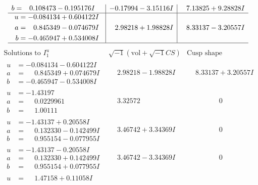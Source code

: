 \documentclass[1p]{elsarticle_modified}
\theoremstyle{definition}
\newcommand{\I}{\sqrt{-1}}
\begin{document}
$$\begin{array}{c|c|c}
\begin{aligned}
b &= \phantom{-}0.108473 - 0.195176 I\end{aligned}
 & -0.17994 - 3.15116 I & \phantom{-}7.13825 + 9.28828 I \\ \hline\begin{aligned}
u &= -0.084134 + 0.604122 I \\
a &= \phantom{-}0.845349 - 0.074679 I \\
b &= -0.465947 + 0.534008 I\end{aligned}
 & \phantom{-}2.98218 + 1.98828 I & \phantom{-}8.33137 - 3.20557 I\\
 \hline 
 \end{array}$$\newpage$$\begin{array}{c|c|c}  
\text{Solutions to }I^u_{1}& \I (\text{vol} + \sqrt{-1}CS) & \text{Cusp shape}\\
 \hline 
\begin{aligned}
u &= -0.084134 - 0.604122 I \\
a &= \phantom{-}0.845349 + 0.074679 I \\
b &= -0.465947 - 0.534008 I\end{aligned}
 & \phantom{-}2.98218 - 1.98828 I & \phantom{-}8.33137 + 3.20557 I \\ \hline\begin{aligned}
u &= -1.43197\phantom{ +0.000000I} \\
a &= \phantom{-}0.0229961\phantom{ +0.000000I} \\
b &= \phantom{-}1.00111\phantom{ +0.000000I}\end{aligned}
 & \phantom{-}3.32572\phantom{ +0.000000I} & \phantom{-0.000000 } 0 \\ \hline\begin{aligned}
u &= -1.43137 + 0.20558 I \\
a &= \phantom{-}0.132330 - 0.142499 I \\
b &= \phantom{-}0.955154 - 0.077955 I\end{aligned}
 & \phantom{-}3.46742 + 3.34369 I & \phantom{-0.000000 } 0 \\ \hline\begin{aligned}
u &= -1.43137 - 0.20558 I \\
a &= \phantom{-}0.132330 + 0.142499 I \\
b &= \phantom{-}0.955154 + 0.077955 I\end{aligned}
 & \phantom{-}3.46742 - 3.34369 I & \phantom{-0.000000 } 0 \\ \hline\begin{aligned}
u &= \phantom{-}1.47158 + 0.11058 I \\

\end{aligned}
\end{array}$$
\end{document}
